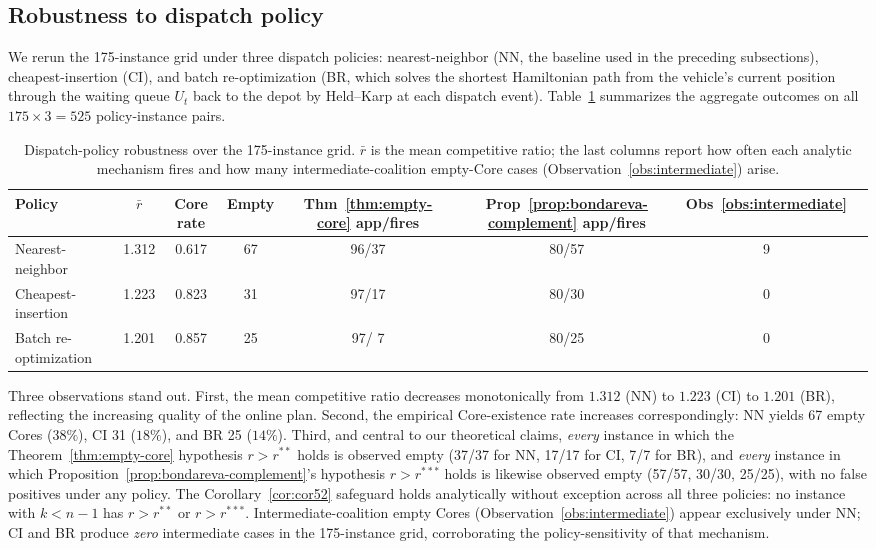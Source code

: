 \documentclass[11pt]{article}
\theoremstyle{plain}
\theoremstyle{definition}
\theoremstyle{remark}
\begin{document}
\subsection{Robustness to dispatch policy}
\label{ssec:policy}

We rerun the 175-instance grid under three dispatch policies: nearest-neighbor (NN, the baseline used in the preceding subsections), cheapest-insertion (CI), and batch re-optimization (BR, which solves the shortest Hamiltonian path from the vehicle's current position through the waiting queue $U_t$ back to the depot by Held--Karp at each dispatch event). Table~\ref{tab:policy} summarizes the aggregate outcomes on all $175\times 3 = 525$ policy-instance pairs.

\begin{table}[t]
\centering
\caption{Dispatch-policy robustness over the 175-instance grid. $\bar r$ is the mean competitive ratio; the last columns report how often each analytic mechanism fires and how many intermediate-coalition empty-Core cases (Observation~\ref{obs:intermediate}) arise.}
\label{tab:policy}
\small
\begin{tabular}{@{}lccccccc@{}}
\toprule
Policy & $\bar r$ & Core rate & Empty & Thm~\ref{thm:empty-core} app/fires & Prop~\ref{prop:bondareva-complement} app/fires & Obs~\ref{obs:intermediate} \\
\midrule
Nearest-neighbor      & 1.312 & 0.617 & 67 & 96/37 & 80/57 & 9 \\
Cheapest-insertion    & 1.223 & 0.823 & 31 & 97/17 & 80/30 & 0 \\
Batch re-optimization & 1.201 & 0.857 & 25 & 97/ 7 & 80/25 & 0 \\
\bottomrule
\end{tabular}
\end{table}

Three observations stand out. First, the mean competitive ratio decreases monotonically from $1.312$ (NN) to $1.223$ (CI) to $1.201$ (BR), reflecting the increasing quality of the online plan. Second, the empirical Core-existence rate increases correspondingly: NN yields 67 empty Cores ($38\%$), CI 31 ($18\%$), and BR 25 ($14\%$). Third, and central to our theoretical claims, \emph{every} instance in which the Theorem~\ref{thm:empty-core} hypothesis $r>r^{\ast\ast}$ holds is observed empty (37/37 for NN, 17/17 for CI, 7/7 for BR), and \emph{every} instance in which Proposition~\ref{prop:bondareva-complement}'s hypothesis $r>r^{\ast\ast\ast}$ holds is likewise observed empty (57/57, 30/30, 25/25), with no false positives under any policy. The Corollary~\ref{cor:cor52} safeguard holds analytically without exception across all three policies: no instance with $k<n-1$ has $r>r^{\ast\ast}$ or $r>r^{\ast\ast\ast}$. Intermediate-coalition empty Cores (Observation~\ref{obs:intermediate}) appear exclusively under NN; CI and BR produce \emph{zero} intermediate cases in the 175-instance grid, corroborating the policy-sensitivity of that mechanism.
\end{document}
